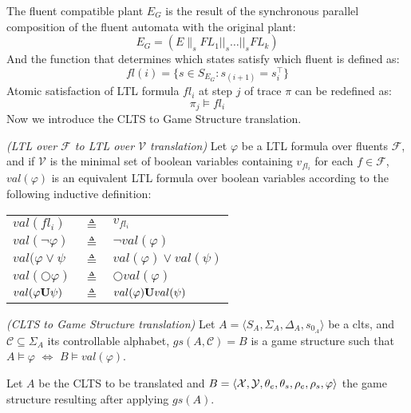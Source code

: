 The fluent compatible plant $E_G$ is the result of the synchronous parallel composition of the fluent automata with the original plant:
\[E_G = (E \parallel_s FL_1 ||_s \ldots ||_s FL_k) \]
And the function that determines which states satisfy which fluent is defined as:
\[ fl(i) = \{s \in S_{E_G} : s_{(i + 1)} = s^{\top}_i \} \]
Atomic satisfaction of LTL formula $fl_i$ at step $j$ of trace $\pi$ can be redefined as:
\[ \pi_j \models fl_i \]
Now we introduce the CLTS to Game Structure translation.
\begin{definition}
	\label{def:val_ltl} \emph{(LTL over $\mathcal{F}$ to LTL over $\mathcal{V}$ translation)} 
	Let $\varphi$ be a LTL formula over fluents $\mathcal{F}$, and if $\mathcal{V}$ is the minimal set of boolean variables containing $v_{fl_i}$ for each $f \in \mathcal{F}$, $val(\varphi)$ is an equivalent LTL formula over boolean variables according to the following inductive definition:\\
	
	\begin{tabular}{ l c l }
		$val(fl_i)$ & $\triangleq$ & $v_{fl_i}$\\	
		$val(\neg \varphi)$ & $\triangleq$ & $\neg val(\varphi)$\\
		$val(\varphi \vee \psi$ & $\triangleq$ & $val(\varphi) \vee val(\psi)$\\
		$val(\bigcirc \varphi)$ & $\triangleq$ & $\bigcirc val(\varphi)$\\
		$val(\varphi {\bf U} \psi)$ & $\triangleq$ & $val(\varphi) {\bf U} val(\psi)$\\
	\end{tabular}	
\end{definition}

\begin{definition}
	\label{def:clts_to_gs_translation} \emph{(CLTS to Game Structure translation)} 
	Let $A = \langle S_A, \Sigma_A, \Delta_A, s_{0_A} \rangle$ be a clts, and $\mathcal{C}\subseteq \Sigma_A$ its controllable alphabet, $gs(A,\mathcal{C})=B$ is a game structure such that $A \models \varphi$ $\iff$ $B \models val(\varphi)$.
\end{definition}

Let $A$ be the CLTS to be translated and $B =  \langle {\mathcal{X}}, {\mathcal{Y}}, {\theta_e}, {\theta_s}, {\rho_e}, {\rho_s}, \varphi \rangle$ the game structure resulting after applying $gs(A)$. 

